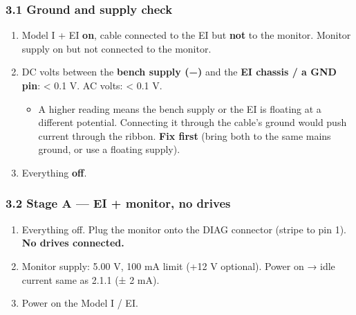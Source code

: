 \documentclass[
  10pt,
]{article}
\providecommand{\tightlist}{%
  \setlength{\itemsep}{0pt}\setlength{\parskip}{0pt}}
\begin{document}
\hypertarget{ground-and-supply-check}{%
\subsubsection{3.1 Ground and supply
check}\label{ground-and-supply-check}}

\begin{enumerate}
\def\labelenumi{\arabic{enumi}.}
\tightlist
\item
  Model I + EI \textbf{on}, cable connected to the EI but
  \textbf{not} to the monitor. Monitor supply on but not
  connected to the monitor.
\item
  DC volts between the \textbf{bench supply (−)} and the
  \textbf{EI chassis / a GND pin}: \textless{} 0.1 V. AC
  volts: \textless{} 0.1 V.

  \begin{itemize}
  \tightlist
  \item
    A higher reading means the bench supply or the EI is
    floating at a different potential. Connecting it through
    the cable's ground would push current through the
    ribbon. \textbf{Fix first} (bring both to the same mains
    ground, or use a floating supply).
  \end{itemize}
\item
  Everything \textbf{off}.
\end{enumerate}

\hypertarget{stage-a-ei-monitor-no-drives}{%
\subsubsection{3.2 Stage A --- EI + monitor, no
drives}\label{stage-a-ei-monitor-no-drives}}

\begin{enumerate}
\def\labelenumi{\arabic{enumi}.}
\tightlist
\item
  Everything off. Plug the monitor onto the DIAG connector
  (stripe to pin 1). \textbf{No drives connected.}
\item
  Monitor supply: 5.00 V, 100 mA limit (+12 V optional).
  Power on → idle current same as 2.1.1 (± 2 mA).
\item
  Power on the Model I / EI.
\end{enumerate}
\end{document}
